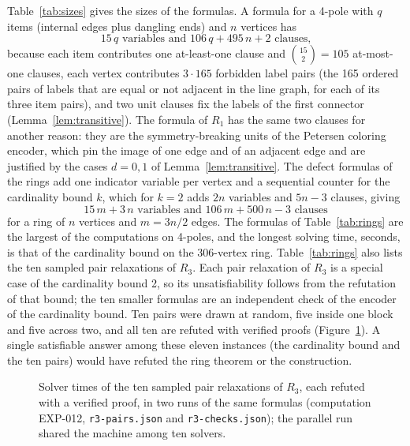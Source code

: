 \documentclass[11pt]{article}
\theoremstyle{definition}
\theoremstyle{remark}
\begin{document}



Table~\ref{tab:sizes} gives the sizes of the formulas. A formula for a 4-pole with $q$ items (internal
edges plus dangling ends) and $n$ vertices has
\begin{equation}\label{eq:size-pole}
15\,q \text{ variables and } 106\,q + 495\,n + 2 \text{ clauses,}
\end{equation}
because each item contributes one at-least-one clause and $\binom{15}{2} = 105$ at-most-one clauses, each
vertex contributes $3 \cdot 165$ forbidden label pairs (the 165 ordered pairs of labels that are equal or not
adjacent in the line graph, for each of its three item pairs), and two unit clauses fix the labels of
the first connector (Lemma~\ref{lem:transitive}). The formula of $R_1$ has the same two clauses for another reason: they are the symmetry-breaking units
of the Petersen coloring encoder, which pin the image of one edge and of an adjacent edge and are justified by the cases $d = 0, 1$ of Lemma~\ref{lem:transitive}. The defect formulas of the rings add one indicator variable per vertex and a sequential counter
for the cardinality bound $k$, which for $k = 2$ adds $2n$ variables and $5n - 3$ clauses, giving
\begin{equation}\label{eq:size-ring}
15\,m + 3\,n \text{ variables and } 106\,m + 500\,n - 3 \text{ clauses}
\end{equation}
for a ring of $n$ vertices and $m = 3n/2$ edges. The formulas of Table~\ref{tab:rings} are the largest of the
computations on 4-poles, and the longest solving time, \nRthreeSolve{} seconds, is that of the cardinality
bound on the 306-vertex ring. Table~\ref{tab:rings} also lists the ten sampled pair relaxations of $R_3$. Each pair relaxation of $R_3$ is a special case of the cardinality bound 2, so its
unsatisfiability follows from the refutation of that bound; the ten smaller formulas are an independent check of the
encoder of the cardinality bound. Ten pairs were drawn at random, five inside one block and five across two, and all
ten are refuted with verified proofs (Figure~\ref{fig:pairs}). A single satisfiable answer among these eleven instances
(the cardinality bound and the ten pairs) would have refuted the ring theorem or the construction.

\begin{figure}[t]\centering

\caption{Solver times of the ten sampled pair relaxations of $R_3$, each refuted with a verified proof, in two runs of the same
formulas (computation EXP-012, \texttt{r3-pairs.json} and \texttt{r3-checks.json}); the parallel run shared the machine among ten solvers.}\label{fig:pairs}
\end{figure}
\end{document}
